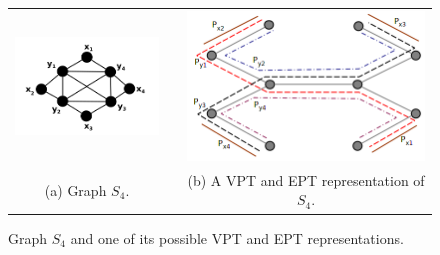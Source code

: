 \begin{figure}[htb]
  \centering
  \begin{tabular}{ c c c }
    \centering
    \includegraphics[width=5cm]{img/s4.png} & &
    \includegraphics[width=8cm]{img/s4eptRepresentation.png}
    \\
    \footnotesize \centering 
    (a)  \footnotesize Graph $S_4$. &&  \footnotesize (b) A VPT and EPT representation of $S_{4}$. \\

  \end{tabular}

 \caption{Graph $S_4$ and one of its possible VPT and EPT representations.}
 \label{fig:exemplos}
\end{figure} 
